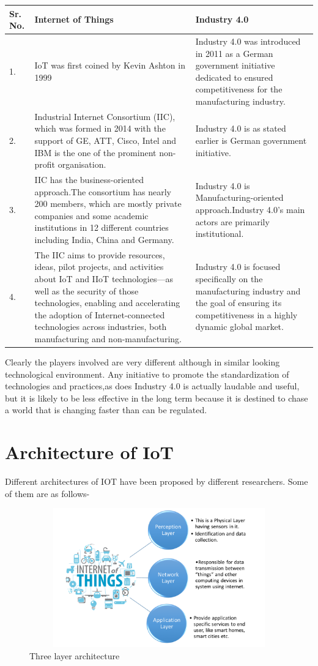 \documentclass[12pt, a4paper]{report}
\begin{document}
\begin{center}
\begin{tabular}{ | m{1cm} | m{15em} | m{15em} | } 
 \hline
 Sr. No. & Internet of Things & Industry 4.0 \\
 \hline 
 1.& IoT was first coined by Kevin Ashton in 1999 & Industry 4.0 was introduced in 2011 as a German government initiative dedicated to ensured competitiveness for the manufacturing industry.  \\ 
 \hline
 2. &  Industrial Internet Consortium (IIC), which was formed in 2014 with the support of GE, ATT, Cisco, Intel and IBM is the one of the prominent non-profit organisation. & Industry 4.0 is as stated earlier is German government initiative.  \\ 
 \hline
 3. & IIC has the business-oriented approach.The consortium has nearly 200 members, which are mostly private companies and some academic institutions in 12 different countries including India, China and Germany. & Industry 4.0 is Manufacturing-oriented approach.Industry 4.0’s main actors are primarily institutional.\\
 \hline
 4. & The IIC aims to provide resources, ideas, pilot projects, and activities about IoT and IIoT technologies—as well as the security of those technologies, enabling and accelerating the adoption of Internet-connected technologies across industries, both manufacturing and non-manufacturing. & Industry 4.0 is focused specifically on the manufacturing industry and the goal of ensuring its competitiveness in a highly dynamic global market.\\
 \hline
\end{tabular}
\end{center}
Clearly the players involved are very different although in similar looking technological environment. Any initiative to promote the standardization of technologies and practices,as does Industry 4.0 is actually laudable and useful, but it is likely to be less effective in the long term because it is destined to chase a world that is changing faster than can be regulated.\cite{is}
\chapter{Architecture of IoT}
Different architectures of IOT have been proposed by different researchers. Some of them are as follows-
\begin{figure}[h]
\centering
\includegraphics[width=12cm, height=6cm]{Picture1}
\caption{Three layer architecture}
\label{figure-3}
\end{figure}
\end{document}
